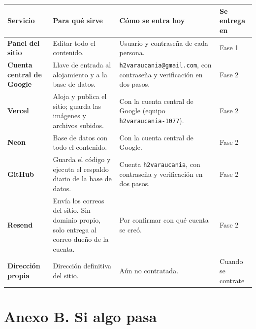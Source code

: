 \documentclass[11pt,letterpaper]{article}
\newcommand{\cab}[1]{\textbf{\color{h2vgris}#1}}
\newcommand{\fila}[1]{\textbf{\color{h2vazul}#1}}
\begin{document}
\begin{tabularx}{\textwidth}{@{}P{3.3cm}YYP{2.3cm}@{}}
\toprule
\cab{Servicio} & \cab{Para qué sirve} & \cab{Cómo se entra hoy} & \cab{Se entrega en}\\
\midrule
\fila{Panel del sitio} & Editar todo el contenido. & Usuario y contraseña de cada persona. & Fase 1\\
\fila{Cuenta central de Google} & Llave de entrada al alojamiento y a la base de datos. & {\small\texttt{h2varaucania@gmail.com}}, con contraseña y verificación en dos pasos. & Fase 2\\
\fila{Vercel} & Aloja y publica el sitio; guarda las imágenes y archivos subidos. & Con la cuenta central de Google (equipo \texttt{h2varaucania-1077}). & Fase 2\\
\fila{Neon} & Base de datos con todo el contenido. & Con la cuenta central de Google. & Fase 2\\
\fila{GitHub} & Guarda el código y ejecuta el respaldo diario de la base de datos. & Cuenta \texttt{h2varaucania}, con contraseña y verificación en dos pasos. & Fase 2\\
\fila{Resend} & Envía los correos del sitio. Sin dominio propio, solo entrega al correo dueño de la cuenta. & Por confirmar con qué cuenta se creó. & Fase 2\\
\fila{Dirección propia} & Dirección definitiva del sitio. & Aún no contratada. & Cuando se contrate\\
\bottomrule
\end{tabularx}

\section*{Anexo B. Si algo pasa}
\end{document}
